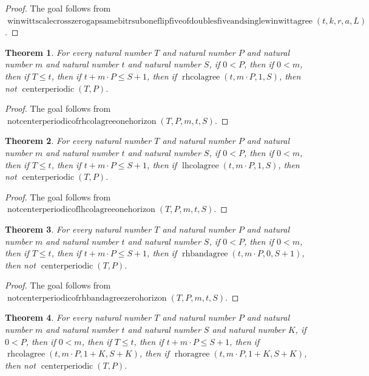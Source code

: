 \documentclass[11pt]{article}
\newtheorem{theorem}{Theorem}[section]
\theoremstyle{definition}
\begin{document}
\begin{proof}
The goal follows from \(\operatorname{winwittscalecrosszerogapsamebitrsuboneflipfiveofdoublesfiveandsinglewinwittagree}(t, k, r, a, L)\).
\end{proof}
\begin{theorem}
\label{ll:paper:not-centerperiodic-of-rhcolagree-one-horizon}
For every natural number \(T\) and natural number \(P\) and natural number \(m\) and natural number \(t\) and natural number \(S\), if \(0 < P\), then if \(0 < m\), then if \(T \le t\), then if \(t + m \cdot P \le S + 1\), then if \(\operatorname{rhcolagree}(t, m \cdot P, 1, S)\), then not \(\operatorname{centerperiodic}(T, P)\).
\end{theorem}
\begin{proof}
The goal follows from \(\operatorname{notcenterperiodicofrhcolagreeonehorizon}(T, P, m, t, S)\).
\end{proof}
\begin{theorem}
\label{ll:paper:not-centerperiodic-of-lhcolagree-one-horizon}
For every natural number \(T\) and natural number \(P\) and natural number \(m\) and natural number \(t\) and natural number \(S\), if \(0 < P\), then if \(0 < m\), then if \(T \le t\), then if \(t + m \cdot P \le S + 1\), then if \(\operatorname{lhcolagree}(t, m \cdot P, 1, S)\), then not \(\operatorname{centerperiodic}(T, P)\).
\end{theorem}
\begin{proof}
The goal follows from \(\operatorname{notcenterperiodicoflhcolagreeonehorizon}(T, P, m, t, S)\).
\end{proof}
\begin{theorem}
\label{ll:paper:not-centerperiodic-of-rhbandagree-zero-horizon}
For every natural number \(T\) and natural number \(P\) and natural number \(m\) and natural number \(t\) and natural number \(S\), if \(0 < P\), then if \(0 < m\), then if \(T \le t\), then if \(t + m \cdot P \le S + 1\), then if \(\operatorname{rhbandagree}(t, m \cdot P, 0, S + 1)\), then not \(\operatorname{centerperiodic}(T, P)\).
\end{theorem}
\begin{proof}
The goal follows from \(\operatorname{notcenterperiodicofrhbandagreezerohorizon}(T, P, m, t, S)\).
\end{proof}
\begin{theorem}
\label{ll:paper:not-centerperiodic-of-rhcenter-inward-determine-horizon}
For every natural number \(T\) and natural number \(P\) and natural number \(m\) and natural number \(t\) and natural number \(S\) and natural number \(K\), if \(0 < P\), then if \(0 < m\), then if \(T \le t\), then if \(t + m \cdot P \le S + 1\), then if \(\operatorname{rhcolagree}(t, m \cdot P, 1 + K, S + K)\), then if \(\operatorname{rhoragree}(t, m \cdot P, 1 + K, S + K)\), then not \(\operatorname{centerperiodic}(T, P)\).
\end{theorem}
\end{document}
